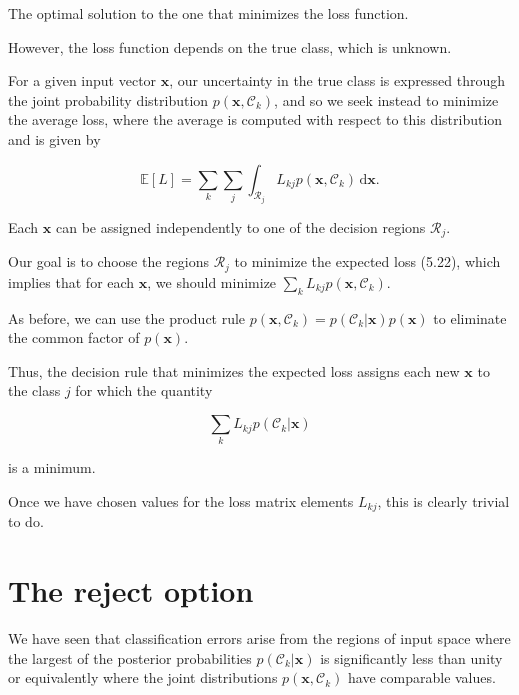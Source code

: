 \documentclass{article}
\begin{document}
The optimal solution to the one that minimizes the loss function. 

However, the loss function depends on the true class, which is unknown. 

For a given input vector $\mathbf{x}$, our uncertainty in the true class is expressed through the joint probability distribution $p(\mathbf{x},\mathcal{C}_{k})$, and so we seek instead to minimize the average loss, where the average is computed with respect to this distribution and is given by

\begin{equation}
\mathbb{E}[L] = \sum_{k}\sum_{j}\int_{\mathcal{R}_{j}}L_{kj}p(\mathbf{x},\mathcal{C}_{k})\,\mathrm{d}\mathbf{x}.
\tag{5.22}
\end{equation}

Each $\mathbf{x}$ can be assigned independently to one of the decision regions $\mathcal{R}_{j}$. 

Our goal is to choose the regions $\mathcal{R}_{j}$ to minimize the expected loss (5.22), which implies that for each $\mathbf{x}$, we should minimize $\sum_{k}L_{kj}p(\mathbf{x},\mathcal{C}_{k})$. 

As before, we can use the product rule $p(\mathbf{x},\mathcal{C}_{k}) = p(\mathcal{C}_{k}|\mathbf{x})p(\mathbf{x})$ to eliminate the common factor of $p(\mathbf{x})$. 

Thus, the decision rule that minimizes the expected loss assigns each new $\mathbf{x}$ to the class $j$ for which the quantity

\begin{equation}
\sum_{k}L_{kj}p(\mathcal{C}_{k}|\mathbf{x})
\tag{5.23}
\end{equation}

is a minimum. 

Once we have chosen values for the loss matrix elements $L_{kj}$, this is clearly trivial to do.

\section{The reject option}

We have seen that classification errors arise from the regions of input space where the largest of the posterior probabilities $p(\mathcal{C}_{k}|\mathbf{x})$ is significantly less than unity or equivalently where the joint distributions $p(\mathbf{x},\mathcal{C}_{k})$ have comparable values. 
\end{document}
